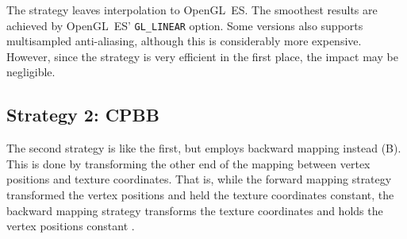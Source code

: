 \documentclass[english,12pt]{ifimaster}
\begin{document}
The strategy leaves interpolation to OpenGL~ES. The smoothest results
are achieved by OpenGL~ES' \lstinline|GL_LINEAR| option. Some versions
also supports multisampled anti-aliasing, although this is
considerably more expensive. However, since the strategy is very
efficient in the first place, the impact may be negligible.

\subsection{Strategy 2: CPBB}

The second strategy is like the first, but employs backward mapping
instead (B). This is done by transforming the other end of the mapping
between vertex positions and texture coordinates. That is, while the
forward mapping strategy transformed the vertex positions and held the
texture coordinates constant, the backward mapping strategy transforms
the texture coordinates and holds the vertex positions constant
\citep{mcreynolds05:-advanced}.
\end{document}
